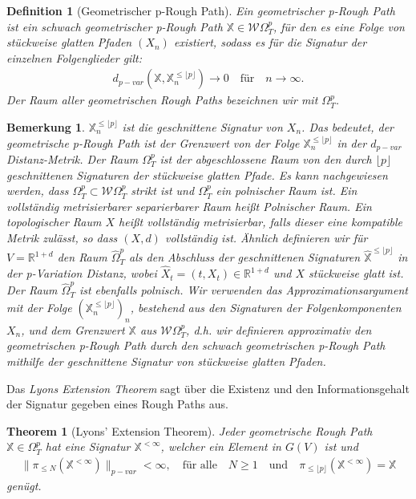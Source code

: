 \documentclass[12pt,titlepage,headsepline]{article}
\newtheorem{definition}{Definition}[section]
\newtheorem{theorem}{Theorem}[section]
\newtheorem*{bemerkung*}{Bemerkung}
\begin{document}
      \begin{definition}[Geometrischer p-Rough Path]
        Ein geometrischer p-Rough Path ist ein schwach geometrischer p-Rough Path $\mathbb{X} \in \mathcal{W}\Omega^p_T$, für den es eine Folge von stückweise glatten Pfaden $(X_n)$ existiert, sodass es für die Signatur der einzelnen Folgenglieder gilt:
        \begin{align*}
          d_{p-var}(\mathbb{X},\mathbb{X}^{\leq \lfloor p \rfloor}_n) \rightarrow 0 \quad \text{für} \quad n \rightarrow \infty.
        \end{align*}
        Der Raum aller geometrischen Rough Paths bezeichnen wir mit $\Omega^p_T$.
      \end{definition}
      \begin{bemerkung*}
        \textup{
        $\mathbb{X}^{\leq \lfloor p \rfloor}_n$ ist die geschnittene Signatur von $X_n$. Das bedeutet, der geometrische p-Rough Path ist der Grenzwert von der Folge $\mathbb{X}^{\leq \lfloor p \rfloor}_n$ in der $d_{p-var}$ Distanz-Metrik. Der Raum $\Omega^p_T$ ist der abgeschlossene Raum von den durch $\lfloor p \rfloor$ geschnittenen Signaturen der stückweise glatten Pfade. Es kann nachgewiesen werden, dass $\Omega^p_T \subset \mathcal{W}\Omega^p_T$ strikt ist und $\Omega^p_T$ ein polnischer Raum ist. Ein vollständig metrisierbarer separierbarer Raum heißt Polnischer Raum. Ein topologischer Raum $X$ heißt vollständig metrisierbar, falls dieser eine kompatible Metrik zulässt, so dass $(X,d)$ vollständig ist.
        Ähnlich definieren wir für $V = \mathbb{R}^{1+d}$ den Raum $\hat{\Omega}^p_T$ als den Abschluss der geschnittenen Signaturen $\hat{\mathbb{X}}^{\leq \lfloor p\rfloor}$ in der p-Variation Distanz, wobei $\hat{X}_t = (t,X_t) \in \mathbb{R}^{1+d}$ und $X$ stückweise glatt ist. Der Raum $\hat{\Omega}^p_T$ ist ebenfalls polnisch. Wir verwenden das Approximationsargument mit der Folge $(\mathbb{X}^{\leq \lfloor p \rfloor}_n)_n$,
        bestehend aus den Signaturen der Folgenkomponenten $X_n$, und dem Grenzwert $\mathbb{X}$ aus $\mathcal{W}\Omega_T^p$, d.h. wir definieren approximativ den geometrischen p-Rough Path durch den schwach geometrischen p-Rough Path mithilfe der geschnittene Signatur von stückweise glatten Pfaden.
        }
      \end{bemerkung*}
      Das \textit{Lyons Extension Theorem} sagt über die Existenz und den Informationsgehalt der Signatur gegeben eines Rough Paths aus.
      \begin{theorem}[Lyons' Extension Theorem]
        Jeder geometrische Rough Path $\mathbb{X} \in \Omega^p_T$ hat eine Signatur $\mathbb{X}^{<\infty}$, welcher ein Element in $G(V)$ ist und
        \begin{align*}
          \lVert \pi_{\leq N}(\mathbb{X}^{<\infty})\rVert_{p-var} < \infty, \quad \text{für alle} \quad N\geq 1 \quad \text{und} \quad \pi_{\leq\lfloor p\rfloor}(\mathbb{X}^{<\infty}) = \mathbb{X}
        \end{align*}
        genügt.
      \end{theorem}
\end{document}
